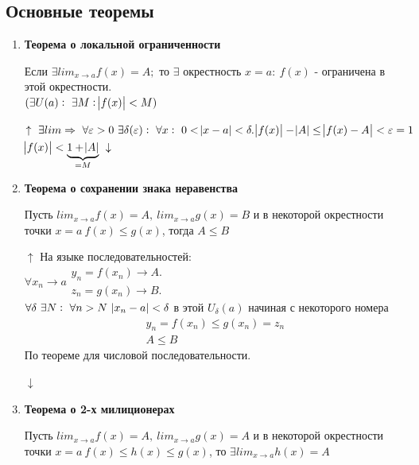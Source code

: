 \documentclass{article}
\begin{document}
  \subsection{Основные теоремы}
  \begin{enumerate}
    \item \textbf{Теорема о локальной ограниченности}

    Если \(\exists lim_{x \rightarrow a} f(x) = A;\) то \(\exists\) окрестность \(x = a:\ f(x)\) - ограничена в этой окрестности. \\
    \( (\exists U(a):\ \exists M: \abs{f(x)} < M) \)

    \(\uparrow\ \exists lim \Rightarrow\ \forall \varepsilon > 0\ \exists \delta(\varepsilon):\ \forall x:\ 0 < \abs{x-a} < \delta.\\ \abs{f(x)}-\abs{A} \leq \abs{f(x)-A}<\varepsilon=1\)\\
    \(\abs{f(x)}< \underbrace{1+\abs{A}}_{=M}\ \downarrow\)

    \item \textbf{Теорема о сохранении знака неравенства}

    Пусть \( lim_{x \rightarrow a} f(x) = A,\ lim_{x \rightarrow a} g(x) = B \) и в некоторой окрестности точки \(x = a\ f(x) \leq g(x)\), тогда \( A \leq B \)

    \(\uparrow\) На языке последовательностей:\\
    \(\forall x_n \rightarrow a \begin{array}{l} y_n = f(x_n) \rightarrow A.\\ z_n = g(x_n) \rightarrow B. \end{array}\)\\
    \(\forall \delta\ \exists N:\ \forall n > N\ \abs{x_n - a} < \delta\) в этой \(U_{\delta}(a)\) начиная с некоторого номера
    \begin{equation*}
      \begin{array}{l}
        y_n = f(x_n) \leq g(x_n) = z_n \\
        A \leq B
      \end{array}
    \end{equation*}
    По теореме для числовой последовательности.

    \(\downarrow\)

    \item \textbf{Теорема о 2-х милиционерах}
    
    Пусть \( lim_{x \rightarrow a} f(x) = A,\ lim_{x \rightarrow a} g(x) = A \) и в некоторой окрестности точки \(x = a\ f(x) \leq h(x) \leq g(x)\), то \(\exists lim_{x \rightarrow a} h(x) = A\)


\end{enumerate}
\end{document}
